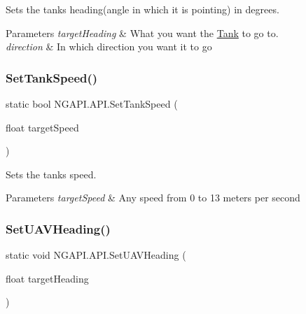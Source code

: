 Sets the tank\textquotesingle{}s heading(angle in which it is pointing) in degrees. 


\begin{DoxyParams}{Parameters}
{\em target\+Heading} & What you want the \hyperlink{class_n_g_a_p_i_1_1_tank}{Tank} to go to. \\
\hline
{\em direction} & In which direction you want it to go \\
\hline
\end{DoxyParams}
\mbox{\label{class_n_g_a_p_i_1_1_a_p_i_a44b396868d10d6182bca1b11fc1e0f65}} 
\subsubsection{\texorpdfstring{Set\+Tank\+Speed()}{SetTankSpeed()}}
{\footnotesize\ttfamily static bool N\+G\+A\+P\+I.\+A\+P\+I.\+Set\+Tank\+Speed (\begin{DoxyParamCaption}\item[{float}]{target\+Speed }\end{DoxyParamCaption})\hspace{0.3cm}{\ttfamily [static]}}



Sets the tank\textquotesingle{}s speed. 


\begin{DoxyParams}{Parameters}
{\em target\+Speed} & Any speed from 0 to 13 meters per second \\
\hline
\end{DoxyParams}
\mbox{\label{class_n_g_a_p_i_1_1_a_p_i_a4f4b52858fe2894e7536c1de321fa894}} 
\subsubsection{\texorpdfstring{Set\+U\+A\+V\+Heading()}{SetUAVHeading()}}
{\footnotesize\ttfamily static void N\+G\+A\+P\+I.\+A\+P\+I.\+Set\+U\+A\+V\+Heading (\begin{DoxyParamCaption}\item[{float}]{target\+Heading }\end{DoxyParamCaption})\hspace{0.3cm}{\ttfamily [static]}}



